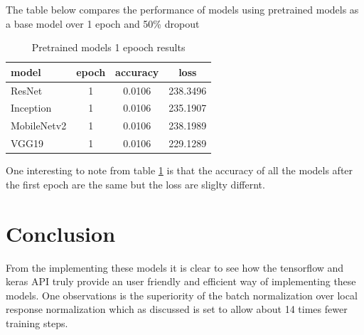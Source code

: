 \documentclass[10pt,phd,a4paper,oneside]{article}
\begin{document}
    The table below compares the performance of models using pretrained models as a base model over 1 epoch and 50\% dropout

    \begin{table}[h!]
        \begin{center}
            \begin{tabular}{ |l|c|c|c| }
                \hline
                model & epoch & accuracy & loss \\
                \hline
                ResNet & 1 & 0.0106  & 238.3496   \\
                Inception & 1 & 0.0106 & 235.1907 \\
                MobileNetv2 & 1 & 0.0106  &  238.1989  \\
                VGG19 & 1 & 0.0106 &  229.1289  \\
                \hline
            \end{tabular}
            \caption{Pretrained models 1 epooch results}
            \label{pretrained}
        \end{center}
    \end{table}

    One interesting to note from table \ref{pretrained} is that the accuracy of all the models after the first epoch are the same but the loss are sliglty differnt.



    \section{Conclusion}
    From the implementing these models it is clear to see how the tensorflow and keras API truly provide an user friendly and efficient way of implementing these models. One observations is the superiority of the batch normalization over local response normalization which as discussed \citep{ioffe2015batch}  is set to allow about 14 times fewer training steps.


    
\end{document}
